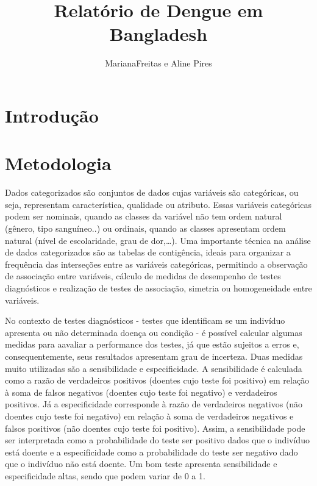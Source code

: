 \documentclass[
]{article}
\title{Relatório de Dengue em Bangladesh}
\author{MarianaFreitas e Aline Pires}
\date{}
\begin{document}
\maketitle

\hypertarget{introduuxe7uxe3o}{%
\section{Introdução}\label{introduuxe7uxe3o}}

\hypertarget{metodologia}{%
\section{Metodologia}\label{metodologia}}

Dados categorizados são conjuntos de dados cujas variáveis são
categóricas, ou seja, representam característica, qualidade ou atributo.
Essas variáveis categóricas podem ser nominais, quando as classes da
variável não tem ordem natural (gênero, tipo sanguíneo..) ou ordinais,
quando as classes apresentam ordem natural (nível de escolaridade, grau
de dor,\ldots). Uma importante técnica na análise de dados categorizados
são as tabelas de contigência, ideais para organizar a frequência das
interseções entre as variáveis categóricas, permitindo a observação de
associação entre variáveis, cálculo de medidas de desempenho de testes
diagnósticos e realização de testes de associação, simetria ou
homogeneidade entre variáveis.

No contexto de testes diagnósticos - testes que identificam se um
indivíduo apresenta ou não determinada doença ou condição - é possível
calcular algumas medidas para aavaliar a performance dos testes, já que
estão sujeitos a erros e, consequentemente, seus resultados apresentam
grau de incerteza. Duas medidas muito utilizadas são a sensibilidade e
especificidade. A sensibilidade é calculada como a razão de verdadeiros
positivos (doentes cujo teste foi positivo) em relação à soma de falsos
negativos (doentes cujo teste foi negativo) e verdadeiros positivos. Já
a especificidade corresponde à razão de verdadeiros negativos (não
doentes cujo teste foi negativo) em relação à soma de verdadeiros
negativos e falsos positivos (não doentes cujo teste foi positivo).
Assim, a sensibilidade pode ser interpretada como a probabilidade do
teste ser positivo dados que o indivíduo está doente e a especificidade
como a probabilidade do teste ser negativo dado que o indivíduo não está
doente. Um bom teste apresenta sensibilidade e especificidade altas,
sendo que podem variar de 0 a 1.
\end{document}

